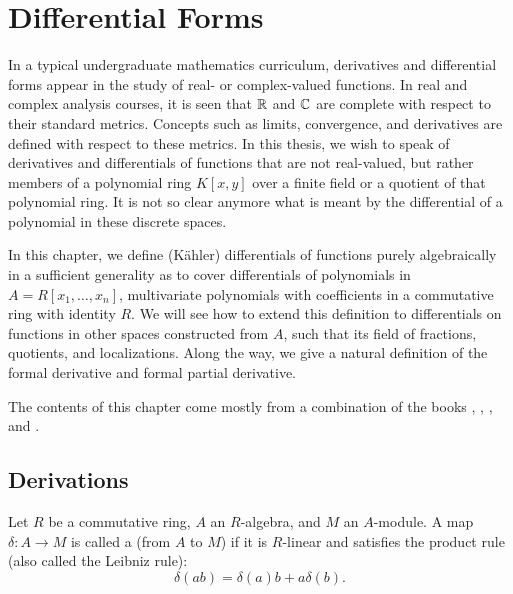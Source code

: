 
\section{Differential Forms}
\label{chap_differentials}

In a typical undergraduate mathematics curriculum,
derivatives and differential forms appear in the study of real- or complex-valued functions.
In real and complex analysis courses,
it is seen that $\mathbb{R}$ and $\mathbb{C}$ are complete with respect to their standard metrics.
Concepts such as limits, convergence, and derivatives are defined with respect to these metrics.
In this thesis, we wish to speak of derivatives and differentials of functions that are not real-valued,
but rather members of a polynomial ring $K[x,y]$ over a finite field or a quotient of that polynomial ring.
It is not so clear anymore what is meant by the differential of a polynomial in these discrete spaces.

In this chapter, we define (K\"ahler) differentials of functions purely algebraically
in a sufficient generality as to cover differentials of polynomials in $A = R[x_1, \ldots, x_n]$,
multivariate polynomials with coefficients in a commutative ring with identity $R$.
We will see how to extend this definition to differentials on functions in other spaces constructed from $A$,
such that its field of fractions, quotients, and localizations.
Along the way, we give a natural definition of the formal derivative and formal partial derivative.

The contents of this chapter come mostly from a combination of the books
\cite{eisenbud95}, \cite{eisenbud00}, \cite{goldschmidt03}, and \cite{stichtenoth09}.




\subsection{Derivations}
\begin{definition}
  Let $R$ be a commutative ring, $A$ an $R$-algebra, and $M$ an $A$-module.
  A map $\delta : A \to M$ is called a  (from $A$ to $M$)
  if it is $R$-linear and satisfies the product rule
  (also called the Leibniz rule):
    \[ \delta(ab) = \delta(a)b + a\delta(b). \]
\end{definition}

